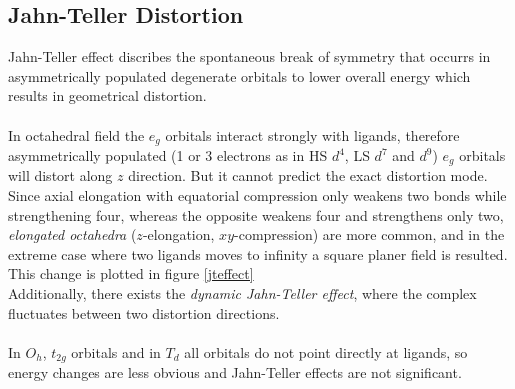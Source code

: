 \subsection{Jahn-Teller Distortion}
%
Jahn-Teller effect discribes the spontaneous break of symmetry that occurrs in 
asymmetrically populated degenerate orbitals to lower overall energy 
which results in geometrical distortion.\\ \\
%
In octahedral field the $e_g$ orbitals interact strongly with ligands, 
therefore asymmetrically populated (1 or 3 electrons as in HS $d^4$, LS $d^7$ and $d^9$) 
$e_g$ orbitals will distort along $z$ direction. 
%
But it cannot predict the exact distortion mode. 
Since axial elongation with equatorial compression only weakens two bonds while strengthening four, 
whereas the opposite weakens four and strengthens only two, 
\emph{elongated octahedra} ($z$-elongation, $xy$-compression) are more common, 
and in the extreme case where two ligands moves to infinity a square planer field is resulted.
This change is plotted in figure \ref{jteffect}\\
%
Additionally, there exists the \emph{dynamic Jahn-Teller effect}, 
where the complex fluctuates between two distortion directions.\\ \\
In $O_h$, $t_{2g}$ orbitals and in $T_d$ all orbitals do not point directly at ligands, 
so energy changes are less obvious and Jahn-Teller effects are not significant.

%
